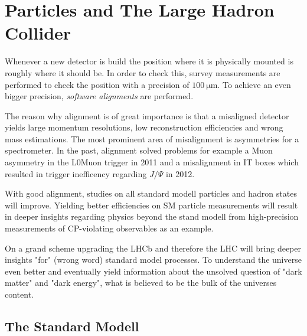\chapter{Particles and The Large Hadron Collider}
\label{sec:particleslhc}


Whenever a new detector is build the position where it is physically mounted is
roughly where it should be. In order to check this, survey measurements are
performed to check the position with a precision of $\SI{100}{\micro\metre}$.
To achieve an even bigger precision, \textit{software alignments} are performed.

The reason why alignment is of great importance is that a misaligned detector
yields large momentum resolutions, low reconstruction efficiencies and wrong
mass estimations.
The most prominent area of misalignment is asymmetries for a spectrometer.
In the past, alignment solved problems for example a Muon asymmetry in the
L0Muon trigger in 2011 and a misalignment in IT boxes which resulted in trigger inefficency regarding $J/\Psi$ in 2012.

With good alignment, studies on all standard modell particles and hadron states
will improve. Yielding better efficiencies on SM particle measurements will
result in deeper insights regarding physics beyond the stand modell from high-precision measurements of CP-violating observables as an example.

On a grand scheme upgrading the LHCb and therefore the LHC will bring deeper
insights "for" (wrong word) standard model processes. To understand the universe even better and eventually yield information about the unsolved question of "dark matter" and
"dark energy", what is believed to be the bulk of the universes content.

\section{The Standard Modell}
\label{sec:sm}

